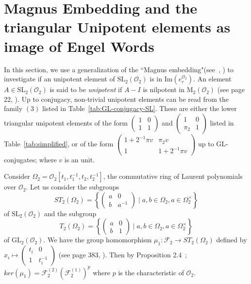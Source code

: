 \documentclass[10pt,twoside]{amsart}
\newcommand{\GL}{\mathrm{GL}}
\newcommand{\SL}{\mathrm{SL}}
\newcommand{\M}{\mathrm{M}}
\newcommand{\im}{\mathrm{Im}}
\newcommand{\R}{\mathcal{O}_2}
\theoremstyle{definition}
\theoremstyle{definition}
\begin{document}
\section{Magnus Embedding and the triangular Unipotent elements as image of Engel Words}{\label{Mag-Uni}}

In this section, we use a generalization of the ``Magnus embedding"(see~\cite{BaZa2016}, \cite{BNT2024}) to investigate if an unipotent element of $\SL_2(\R)$ is in $\im(e_r^{\R})$.  An element $A\in \SL_2(\R)$ is said to be \emph{unipotent} if $A-I$ is nilpotent in $\M_2(\R)$ (see page 22, \cite{HahnOMeara}).  Up to conjugacy, non-trivial unipotent elements can be read from the family $(3)$ listed in Table~\ref{tab:GL-conjugacy-SL}. These are either the lower triangular unipotent elements of the form   $\left(\begin{array}{cc} 1  & 0 \\ 1  & 1 \end{array}\right )$ and $\left(\begin{array}{cc} 1  & 0 \\ \pi_2 & 1 \end{array}\right )$ listed in Table~\ref{tab:simplified}, or of the form $\begin{pmatrix} 1 + 2^{-1}\pi v &\pi_2 v \\ 1 & 1+2^{-1}\pi v \end{pmatrix}$ up to $\GL$-conjugates; where $v$ is an unit.

Consider $\Omega_2 = \R[t_1, t_1^{-1}, t_2, t_2^{-1}]$, the commutative ring of Laurent polynomials over $\R$. Let us consider the subgroups 
$$ ST_2(\Omega_2) = \left\{\left(\begin{array}{cc} a  & 0 \\  b & a^{-1} \end{array} \right)\mid  a, b\in \Omega_2, a\in\Omega_2^{\times} \right\}$$ 
of $\SL_2(\R)$ and the subgroup 
$$T_2(\Omega_2) = \left\{\left(\begin{array}{cc}
   a  & 0 \\   b & 1 \end{array}\right)\mid a,b \in \Omega_2, a \in \Omega_2^{\times} \right\}$$
of $\GL_2(\R)$. 
We have the group homomorphism $\mu_1\colon \mathcal F_2 \rightarrow ST_2(\Omega_2)$ defined by $x_i \mapsto \left(\begin{array}{cc} t_i  & 0 \\ 1 & t_i^{-1} \end{array}\right) $ (see page 383, \cite{BNT2024}). Then by Proposition 2.4~\cite{BNT2024};  $ker(\mu_1) = \mathcal F_2^{(2)}(\mathcal F_2^{(1)})^p$ where $p$ is the characteristic of $\R$.  
\end{document}

